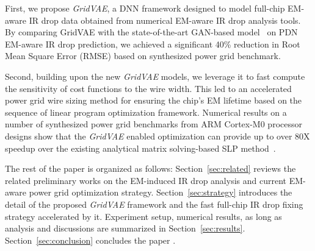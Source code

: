 \begin{itemlist}

\item  First, we propose  {\it GridVAE}, a DNN framework designed to model full-chip EM-aware IR drop data obtained from numerical EM-aware IR drop analysis tools. By comparing GridVAE with the state-of-the-art GAN-based model~\cite{ZhouJin:ICCAD'20} on PDN EM-aware IR drop prediction, we achieved a significant 40\% reduction in Root Mean Square Error (RMSE) based on synthesized power grid benchmark.

\item Second, building upon the new {\it GridVAE} models, we leverage it to fast compute the sensitivity of cost functions to the wire width. This led to an accelerated power grid wire sizing method for ensuring the chip's EM lifetime based on the sequence of linear program optimization framework. Numerical results on a number of synthesized power grid benchmarks from ARM Cortex-M0 processor designs show that the {\it GridVAE} enabled optimization can provide up to over $80$X speedup over the existing analytical matrix solving-based SLP method~\cite{Sukharev:2019pg}.
 
\end{itemlist}

The rest of the paper is organized as follows: Section~\ref{sec:related} reviews the related preliminary works on the EM-induced IR drop analysis and current EM-aware power grid optimization strategy. Section~\ref{sec:strategy} introduces the detail of the proposed {\it GridVAE} framework and the fast full-chip IR drop fixing strategy accelerated by it. Experiment setup, numerical results, as long as analysis and discussions are summarized in Section~\ref{sec:results}.  Section~\ref{sec:conclusion} concludes the paper .